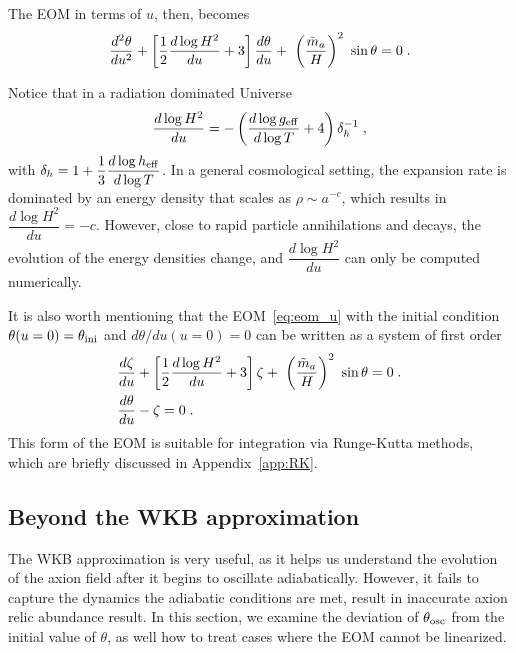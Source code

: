 \documentclass[11pt,a4paper]{article}
\begin{document}
The EOM in terms of $u$, then, becomes
%
\begin{equation}
	\dfrac{d^2  \theta}{du^2} + \left[ \dfrac{1}{2} \dfrac{d \log H^2}{du} + 3  \right] \dfrac{d  \theta}{d u} + \ \left( \dfrac{\tilde m_{a}{}}{H} \right)^2 \ \sin \theta
	=0 \;.
	\label{eq:eom_u}
\end{equation}

Notice that in a radiation dominated Universe
%
$$
\dfrac{d \log H^2}{du} = -\left(  \dfrac{d \log g_{\rm eff}{}}{d \log T} +4  \right) \delta_h^{-1}\;,
$$
with  $ \delta_h = 1+ \dfrac{1}{3} \dfrac{d \log h_{\rm eff}{}}{d \log T} $. 
%
In a general cosmological setting, the expansion rate is dominated by an energy density that scales as $\rho \sim a^{-c}$, which results in $\dfrac{d \log H^2}{du}  = -c$. However, close to rapid particle annihilations and decays, the evolution of the energy densities change, and $\dfrac{d \log H^2}{du}$ can only be computed numerically.

It is also worth mentioning that the EOM~\ref{eq:eom_u} with the initial condition $\theta(u=0)=\theta_{\rm ini}{}$ and $d\theta/du (u=0)=0$ can be written as a system of first order 
%
\begin{eqnarray}
& \dfrac{d  \zeta}{du} + \left[ \dfrac{1}{2} \dfrac{d \log H^2}{du} + 3  \right] \zeta + \ \left( \dfrac{\tilde m_{a}{}}{H} \right)^2 \ \sin \theta
=0 \;. \\ \nonumber
&\dfrac{d \theta}{d u} - \zeta=0 \;.
\label{eq:eom_sys}
\end{eqnarray}
%
This form of the EOM is suitable for integration via Runge-Kutta methods, which are briefly discussed in Appendix~\ref{app:RK}.


\subsection{Beyond the WKB approximation}\label{sec:beyond_WKB}
%
The WKB approximation is very useful, as it helps us understand the evolution of the axion field after it begins to oscillate adiabatically. However, it fails to capture the dynamics the adiabatic conditions are met, result in inaccurate axion relic abundance result. In this section, we examine the deviation of $\theta_{\rm osc}{}$ from the initial value of $\theta$, as well how to treat cases where the EOM cannot be linearized.
\end{document}
